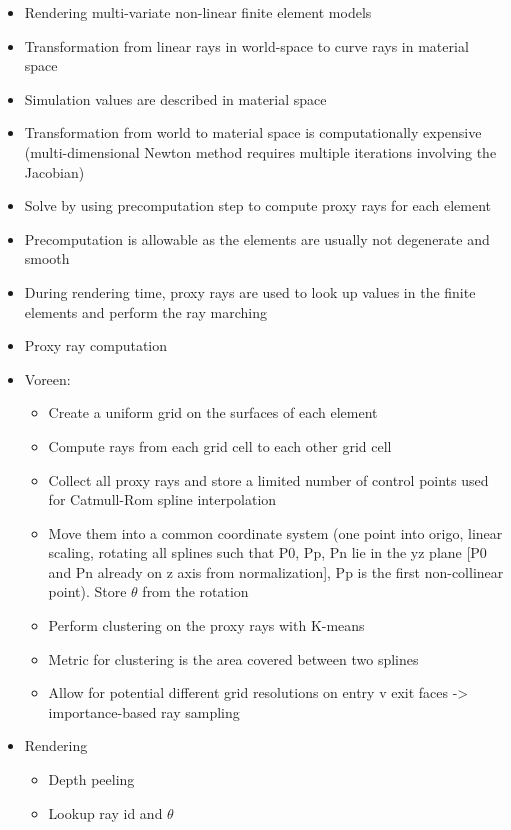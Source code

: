 \begin{itemize}
\item Rendering multi-variate non-linear finite element models
\item Transformation from linear rays in world-space to curve rays in material space
\item Simulation values are described in material space
\item Transformation from world to material space is computationally expensive (multi-dimensional Newton method requires multiple iterations involving the Jacobian)
\item Solve by using precomputation step to compute proxy rays for each element
\item Precomputation is allowable as the elements are usually not degenerate and smooth
\item During rendering time, proxy rays are used to look up values in the finite elements and perform the ray marching
\item Proxy ray computation
\item Voreen: \cite{meyer2009voreen}
\begin{itemize}
    \item Create a uniform grid on the surfaces of each element
    \item Compute rays from each grid cell to each other grid cell
    \item Collect all proxy rays and store a limited number of control points used for Catmull-Rom spline interpolation 
    \item Move them into a common coordinate system (one point into origo, linear scaling, rotating all splines such that P0, Pp, Pn lie in the yz plane [P0 and Pn already on z axis from normalization], Pp is the first non-collinear point). Store $\theta$ from the rotation
    \item Perform clustering on the proxy rays \cite{abraham03clustering} with K-means \cite{hartigan75kmeans}
    \item Metric for clustering is the area covered between two splines
    \item Allow for potential different grid resolutions on entry v exit faces -> importance-based ray sampling
\end{itemize}
\item Rendering
\begin{itemize}
    \item Depth peeling \cite{mammen89DepthPeeling}
    \item Lookup ray id and $\theta$

\end{itemize}
\end{itemize}
